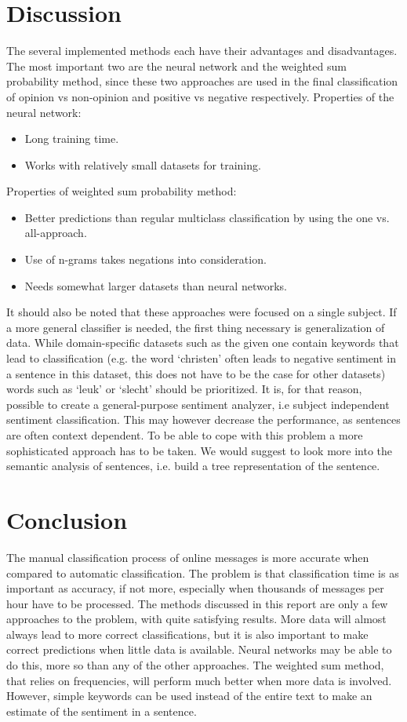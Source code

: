 \documentclass[11pt]{article}
\begin{document}
\section{Discussion}
The several implemented methods each have their advantages and disadvantages. The most important two are the neural network and the weighted sum probability method, since these two approaches are used in the final classification of opinion vs non-opinion and positive vs negative respectively.
Properties of the neural network:
\begin{itemize}
\item Long training time.
\item Works with relatively small datasets for training.
\end{itemize}
Properties of weighted sum probability method:
\begin{itemize}
\item Better predictions than regular multiclass classification by using the one vs. all-approach.
\item Use of n-grams takes negations into consideration.
\item Needs somewhat larger datasets than neural networks.
\end{itemize}
It should also be noted that these approaches were focused on a single subject. If a more general classifier is needed, the first thing necessary is generalization of data. While domain-specific datasets such as the given one contain keywords that lead to classification (e.g. the word `christen’ often leads to negative sentiment in a sentence in this dataset, this does not have to be the case for other datasets) words such as `leuk’ or `slecht’ should be prioritized. It is, for that reason, possible to create a general-purpose sentiment analyzer, i.e subject independent sentiment classification. This may however decrease the performance, as sentences are often context dependent. To be able to cope with this problem a more sophisticated approach has to be taken. We would suggest to look more into the semantic analysis of sentences, i.e. build a tree representation of the sentence.
\section{Conclusion}
The manual classification process of online messages is more accurate when compared to automatic classification. The problem is that classification time is as important as accuracy, if not more, especially when thousands of messages per hour have to be processed. The methods discussed in this report are only a few approaches to the problem, with quite satisfying results. More data will almost always lead to more correct classifications, but it is also important to make correct predictions when little data is available. Neural networks may be able to do this, more so than any of the other approaches. The weighted sum method, that relies on frequencies, will perform much better when more data is involved. However, simple keywords can be used instead of the entire text to make an estimate of the sentiment in a sentence.
\end{document}

